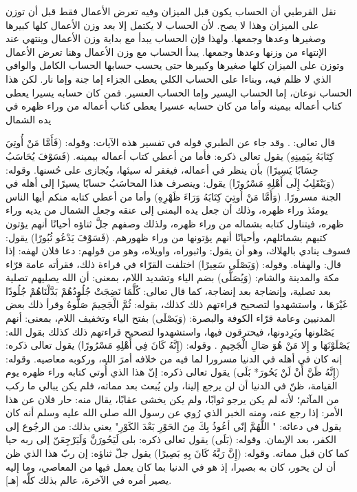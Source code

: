 نقل القرطبي أن الحساب يكون قبل الميزان وفيه تعرض الأعمال فقط قبل أن توزن على الميزان وهذا لا يصح. لأن الحساب لا يكتمل إلا بعد وزن الأعمال كلها كبيرها وصغيرها وعدها وجمعها. ولهذا فإن الحساب يبدأ مع بداية وزن الأعمال وينتهي عند الإنتهاء من وزنها وعدها وجمعها. يبدأ الحساب مع وزن الأعمال وهنا تعرض الأعمال وتوزن على الميزان كلها صغيرها وكبيرها حتى يحسب حسابها الحساب الكامل والوافي الذي لا ظلم فيه، وبناءا على الحساب الكلي يعطى الجزاء إما جنة وإما نار. لكن هذا الحساب نوعان، إما الحساب اليسير وإما الحساب العسير. فمن كان حسابه يسيرا يعطى كتاب أعماله بيمينه وأما من كان حسابه عسيرا يعطى كتاب أعماله من وراء ظهره في يده الشمال 

قال تعالى:   
\quranayah*[84][7-15]{\footnotesize \surahname*[84]}. وقد جاء عن الطبري قوله في تفسير هذه الآيات: وقوله: (فَأَمَّا مَنْ أُوتِيَ كِتَابَهُ بِيَمِينِهِ) يقول تعالى ذكره: فأما من أعطي كتاب أعماله بيمينه. (فَسَوْفَ يُحَاسَبُ حِسَابًا يَسِيرًا) بأن ينظر في أعماله، فيغفر له سيئها، ويُجازى على حُسنها. وقوله: (وَيَنْقَلِبُ إِلَى أَهْلِهِ مَسْرُورًا) يقول: وينصرف هذا المحاسَبُ حسابًا يسيرًا إلى أهله في الجنة مسرورًا. (وَأَمَّا مَنْ أُوتِيَ كِتَابَهُ وَرَاءَ ظَهْرِهِ) وأما من أعطي كتابه منكم أيها الناس يومئذ وراء ظهره، وذلك أن جعل يده اليمنى إلى عنقه وجعل الشمال من يديه وراء ظهره، فيتناول كتابه بشماله من وراء ظهره، ولذلك وصفهم جلَّ ثناؤه أحيانًا أنهم يؤتون كتبهم بشمائلهم، وأحيانًا أنهم يؤتونها من وراء ظهورهم. (فَسَوْفَ يَدْعُو ثُبُورًا) يقول: فسوف ينادي بالهلاك، وهو أن يقول: واثبوراه، واويلاه، وهو من قولهم: دعا فلان لهفه: إذا قال: والهفاه. وقوله: (وَيَصْلَى سَعِيرًا) اختلفت القرّاء في قراءة ذلك، فقرأته عامة قرّاء مكة والمدينة والشام: (وَيُصَلَّى) بضم الياء وتشديد اللام، بمعنى: أن الله يصليهم تصلية بعد تصلية، وإنضاجة بعد إنضاجة، كما قال تعالى: كُلَّمَا نَضِجَتْ جُلُودُهُمْ بَدَّلْنَاهُمْ جُلُودًا غَيْرَهَا ، واستشهدوا لتصحيح قراءتهم ذلك كذلك، بقوله: ثُمَّ الْجَحِيمَ صَلُّوهُ وقرأ ذلك بعض المدنيين وعامة قرّاء الكوفة والبصرة: (وَيَصْلَى) بفتح الياء وتخفيف اللام، بمعنى: أنهم يَصْلونها ويَرِدونها، فيحترقون فيها، واستشهدوا لتصحيح قراءتهم ذلك كذلك بقول الله: يَصْلَوْنَهَا و إِلا مَنْ هُوَ صَالِ الْجَحِيمِ . وقوله: (إِنَّهُ كَانَ فِي أَهْلِهِ مَسْرُورًا) يقول تعالى ذكره: إنه كان في أهله في الدنيا مسرورا لما فيه من خلافه أمرَ الله، وركوبه معاصيه. وقوله: (إِنَّهُ ظَنَّ أَنْ لَنْ يَحُورَ* بَلَى) يقول تعالى ذكره: إنّ هذا الذي أُوتي كتابه وراء ظهره يوم القيامة، ظنّ في الدنيا أن لن يرجع إلينا، ولن يُبعث بعد مماته، فلم يكن يبالي ما ركب من المآثم؛ لأنه لم يكن يرجو ثوابًا، ولم يكن يخشى عقابًا، يقال منه: حار فلان عن هذا الأمر: إذا رجع عنه، ومنه الخبر الذي رُوي عن رسول الله صلى الله عليه وسلم أنه كان يقول في دعائه: " اللَّهُمَّ إنّي أعُوذُ بِكَ مِنَ الحَوْرِ بَعْدَ الكَوْرِ" يعني بذلك: من الرجُوع إلى الكفر، بعد الإيمان. وقوله: (بَلَى) يقول تعالى ذكره: بلى لَيَحُورَنَّ وَلَيَرْجِعَنّ إلى ربه حيا كما كان قبل مماته. وقوله: (إِنَّ رَبَّهُ كَانَ بِهِ بَصِيرًا) يقول جلّ ثناؤه: إن ربّ هذا الذي ظن أن لن يحور، كان به بصيرا، إذ هو في الدنيا بما كان يعمل فيها من المعاصي، وما إليه يصير أمره في الآخرة، عالم بذلك كلِّه [هـ].

